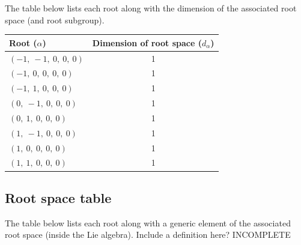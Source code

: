 \documentclass[11pt]{article}
\newcommand{\noi}{\noindent}
\theoremstyle{definition}
\begin{document}
The table below lists each root along with the dimension of the associated root space (and root subgroup).

\bigskip

\noindent \begin{tabular}{|l|c|}
    \hline
    \textbf{Root ($\alpha$)} & \textbf{Dimension of root space ($d_{\alpha}$)} \\
    \hline
    $\left( -1, \  -1, \  0, \  0, \  0\right)$ & 1 \\
    \hline
    $\left( -1, \  0, \  0, \  0, \  0\right)$ & 1 \\
    \hline
    $\left( -1, \  1, \  0, \  0, \  0\right)$ & 1 \\
    \hline
    $\left( 0, \  -1, \  0, \  0, \  0\right)$ & 1 \\
    \hline
    $\left( 0, \  1, \  0, \  0, \  0\right)$ & 1 \\
    \hline
    $\left( 1, \  -1, \  0, \  0, \  0\right)$ & 1 \\
    \hline
    $\left( 1, \  0, \  0, \  0, \  0\right)$ & 1 \\
    \hline
    $\left( 1, \  1, \  0, \  0, \  0\right)$ & 1 \\
    \hline
\end{tabular}


\subsection{Root space table}

\noi The table below lists each root along with a generic element of the associated root space (inside the Lie algebra). Include a definition here? INCOMPLETE

\bigskip
\end{document}
